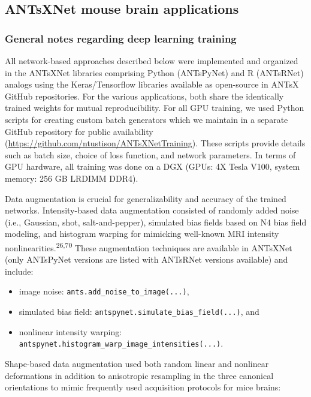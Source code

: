 \documentclass[
  12pt,
]{article}
\begin{document}
\hypertarget{antsxnet-mouse-brain-applications}{%
\subsection{ANTsXNet mouse brain
applications}\label{antsxnet-mouse-brain-applications}}

\hypertarget{general-notes-regarding-deep-learning-training}{%
\subsubsection{General notes regarding deep learning
training}\label{general-notes-regarding-deep-learning-training}}

All network-based approaches described below were implemented and
organized in the ANTsXNet libraries comprising Python (ANTsPyNet) and R
(ANTsRNet) analogs using the Keras/Tensorflow libraries available as
open-source in ANTsX GitHub repositories. For the various applications,
both share the identically trained weights for mutual reproducibility.
For all GPU training, we used Python scripts for creating custom batch
generators which we maintain in a separate GitHub repository for public
availability (\url{https://github.com/ntustison/ANTsXNetTraining}).
These scripts provide details such as batch size, choice of loss
function, and network parameters. In terms of GPU hardware, all training
was done on a DGX (GPUs: 4X Tesla V100, system memory: 256 GB LRDIMM
DDR4).

Data augmentation is crucial for generalizability and accuracy of the
trained networks. Intensity-based data augmentation consisted of
randomly added noise (i.e., Gaussian, shot, salt-and-pepper), simulated
bias fields based on N4 bias field modeling, and histogram warping for
mimicking well-known MRI intensity
nonlinearities.\textsuperscript{26,70} These augmentation techniques are
available in ANTsXNet (only ANTsPyNet versions are listed with ANTsRNet
versions available) and include:

\begin{itemize}
\item
  image noise: \texttt{ants.add\_noise\_to\_image(...)},
\item
  simulated bias field: \texttt{antspynet.simulate\_bias\_field(...)},
  and
\item
  nonlinear intensity warping:
  \texttt{antspynet.histogram\_warp\_image\_intensities(...)}.
\end{itemize}

Shape-based data augmentation used both random linear and nonlinear
deformations in addition to anisotropic resampling in the three
canonical orientations to mimic frequently used acquisition protocols
for mice brains:
\end{document}
